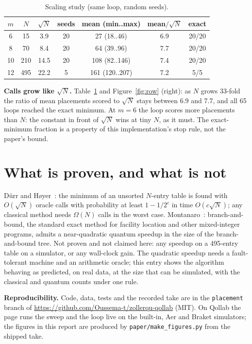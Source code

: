 \documentclass[10pt,twocolumn]{article}
\begin{document}
\begin{table}[t]\centering\footnotesize\setlength{\tabcolsep}{4pt}
\caption{Scaling study (same loop, random seeds).}
\begin{tabular}{@{}ccccccc@{}}\toprule
$m$ & $N$ & $\sqrt N$ & seeds & mean (min..max) & mean$/\sqrt N$ & exact\\\midrule
6 & 15 & 3.9 & 20 & 27 (18..46) & 6.9 & 20/20\\
8 & 70 & 8.4 & 20 & 64 (39..96) & 7.7 & 20/20\\
10 & 210 & 14.5 & 20 & 108 (82..146) & 7.4 & 20/20\\
12 & 495 & 22.2 & 5 & 161 (120..207) & 7.2 & 5/5\\
\bottomrule\end{tabular}
\label{tab:scaling}
\end{table}

\textbf{Calls grow like $\sqrt N$.} Table~\ref{tab:scaling} and Figure~\ref{fig:row} (right): as $N$ grows 33-fold the ratio of mean placements scored to $\sqrt N$ stays between 6.9 and 7.7, and all 65 loops reached the exact minimum. At $m=6$ the loop scores more placements than $N$: the constant in front of $\sqrt N$ wins at tiny $N$, as it must. The exact-minimum fraction is a property of this implementation's stop rule, not the paper's bound.

\section{What is proven, and what is not}
D\"urr and H{\o}yer~\cite{dh}: the minimum of an unsorted $N$-entry table is found with $O(\sqrt N)$ oracle calls with probability at least $1-1/2^c$ in time $O(c\sqrt N)$; any classical method needs $\Omega(N)$ calls in the worst case. Montanaro~\cite{montanaro}: branch-and-bound, the standard exact method for facility location and other mixed-integer programs, admits a near-quadratic quantum speedup in the size of the branch-and-bound tree. Not proven and not claimed here: any speedup on a 495-entry table on a simulator, or any wall-clock gain. The quadratic speedup needs a fault-tolerant machine and an arithmetic oracle; this entry shows the algorithm behaving as predicted, on real data, at the size that can be simulated, with the classical and quantum counts under one rule.

\textbf{Reproducibility.} Code, data, tests and the recorded take are in the \texttt{placement} branch of \url{https://github.com/Oussema-t/zollerqu-qollab} (MIT). On Qollab the page runs the sweep and the loop live on the built-in, Aer and Braket simulators; the figures in this report are produced by \texttt{paper/make\_figures.py} from the shipped take.
\end{document}
